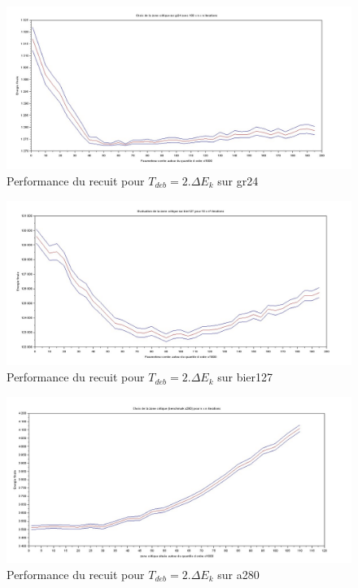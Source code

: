 \documentclass{article}%
\begin{document}
	\begin{figure}[!h]
	\begin{center}
	\includegraphics[scale=0.25]{gr24_zonecritique.jpg}
	\caption{Performance du recuit pour $ T_{deb} = 2. \Delta E_{k} $ sur gr24}
	\label{gr24_zone}
	\end{center}
	\end{figure}
	
	\begin{figure}[!h]
	\begin{center}
	\includegraphics[scale=0.25]{bier127_zonecritique.jpg}
	\caption{Performance du recuit pour $ T_{deb} = 2. \Delta E_{k} $ sur bier127}
	\label{bier127_zone}
	\end{center}
	\end{figure}
	
	\begin{figure}[!h]
	\begin{center}
	\includegraphics[scale=0.25]{a280_zonecritique.jpg}
	\caption{Performance du recuit pour $ T_{deb} = 2. \Delta E_{k} $ sur a280}
	\label{a280_zone}
	\end{center}
	\end{figure}
		
\end{document}
